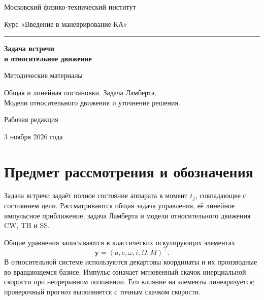 \documentclass[a4paper,11pt]{article}
\numberwithin{equation}{section}
\theoremstyle{remark}
\newcommand{\vect}[1]{\boldsymbol{#1}}
\begin{document}
\begin{titlepage}
\centering
{\large Московский физико-технический институт\par}
\vspace{8mm}
{\large Курс «Введение в маневрирование КА»\par}
\vspace{32mm}
{\color{accent}\rule{28mm}{.8pt}\par}
\vspace{9mm}
{\LARGE\bfseries Задача встречи\\[3mm]
и относительное движение\par}
\vspace{10mm}
{\large Методические материалы\par}
\vspace{8mm}
{Общая и линейная постановки. Задача Ламберта.\\
Модели относительного движения и уточнение решения.\par}
\vfill
{Рабочая редакция\par}
\vspace{3mm}
{3 ноября 2026 года\par}
\end {titlepage}
\setcounter{page}{2}
\tableofcontents
\clearpage

\section*{Предмет рассмотрения и обозначения}

Задача встречи задаёт полное состояние аппарата в момент $t_f$,
совпадающее с состоянием цели. Рассматриваются общая задача
управления, её линейное импульсное приближение, задача Ламберта
и модели относительного движения CW, TH и SS.

Общие уравнения записываются в классических оскулирующих элементах
\[
 \vect y=(a,e,\omega,i,\Omega,M)^\top.
\]
В относительной системе используются декартовы координаты
и их производные во вращающемся базисе.
Импульс означает мгновенный скачок инерциальной скорости
при непрерывном положении. Его влияние на элементы
линеаризуется; проверочный прогноз выполняется
с точным скачком скорости.
\end{document}
